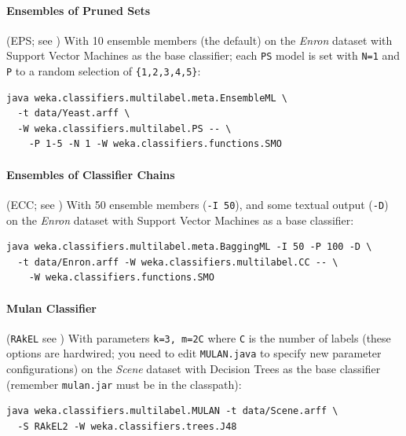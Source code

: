 \documentclass[11pt]{article}
\begin{document}
\paragraph{Ensembles of Pruned Sets} (EPS; see \cite{EPS}) With 10 ensemble members (the default) on the \textit{Enron} dataset with Support Vector Machines as the base classifier; each \texttt{PS} model is set with \texttt{N=1} and \texttt{P} to a random selection of \texttt{\{1,2,3,4,5\}}:

\begin{verbatim}
java weka.classifiers.multilabel.meta.EnsembleML \
  -t data/Yeast.arff \
  -W weka.classifiers.multilabel.PS -- \
    -P 1-5 -N 1 -W weka.classifiers.functions.SMO
\end{verbatim}

\paragraph{Ensembles of Classifier Chains} (ECC; see \cite{ECC2}) With 50 ensemble members (\texttt{-I 50}), and some textual output (\texttt{-D}) on the \textit{Enron} dataset with Support Vector Machines as a base classifier:
\begin{verbatim}
java weka.classifiers.multilabel.meta.BaggingML -I 50 -P 100 -D \
  -t data/Enron.arff -W weka.classifiers.multilabel.CC -- \
    -W weka.classifiers.functions.SMO
\end{verbatim}

\paragraph{Mulan Classifier} (\texttt{RAkEL} see \cite{RAKEL}) With parameters \texttt{\texttt{k=3}, \texttt{m=2C}} where \texttt{C} is the number of labels (these options are hardwired; you need to edit \texttt{MULAN.java} to specify new parameter configurations) on the \textit{Scene} dataset with Decision Trees as the base classifier (remember {\texttt{mulan.jar} must be in the classpath}):
\begin{verbatim}
java weka.classifiers.multilabel.MULAN -t data/Scene.arff \ 
  -S RAkEL2 -W weka.classifiers.trees.J48
\end{verbatim}

\end{document}
